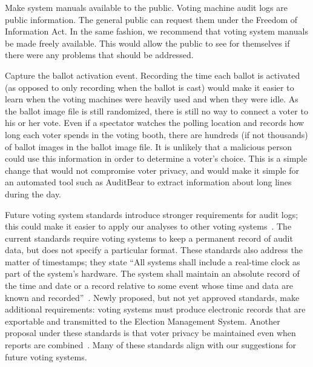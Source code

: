 \documentclass[letterpaper,twocolumn,10pt]{article}
\begin{document}
Make system manuals available to the public. Voting machine audit logs are
public information. The general public can request them under the Freedom of
Information Act. In the same fashion, we recommend that voting system manuals be
made freely available. This would allow the public to see for themselves if
there were any problems that should be addressed.  
 
Capture the ballot activation event. Recording the time each ballot is activated
(as opposed to only recording when the ballot is cast) would make it easier to
learn when the voting machines were heavily used and when they were idle. As the 
ballot image file is still randomized, there is still no way to connect a voter 
to his or her vote.  Even if a spectator watches the polling location and records 
how long each voter spends in the voting booth, there are hundreds (if not thousands) 
of ballot images in the ballot image file.  It is unlikely that a malicious person 
could use this information in order to determine a voter's choice.  This
is a simple change that would not compromise voter privacy, and would make it
simple for an automated tool such as AuditBear to extract information
about long lines during the day.

Future voting system standards introduce stronger
requirements for audit logs; this could make it easier to apply our analyses to
other voting systems~\cite{Wagner2010}. The current standards require voting systems 
to keep a permanent record of audit data, but does not specify a particular format. 
These standards also address the matter of timestamps; they state 
``All systems shall include a real-time clock as part of the system’s hardware.
The system shall maintain an absolute record of the time and date or a record
relative to some event whose time and data are known and recorded''~\cite{CurrentStandards}. Newly proposed, 
but not yet approved standards, make additional requirements: voting systems must 
produce electronic records that are exportable and transmitted to the Election Management 
System.  Another proposal under these standards is that voter privacy be maintained 
even when reports are combined~\cite{ProposedStandards}.  Many of these standards align with our suggestions for 
future voting systems. 
 
\end{document}
